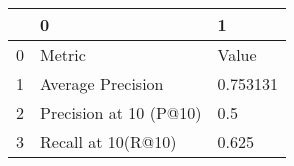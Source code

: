 \begin{tabular}{lll}
\toprule
{} &                       0 &         1 \\
\midrule
0 &                  Metric &     Value \\
1 &       Average Precision &  0.753131 \\
2 &  Precision at 10 (P@10) &       0.5 \\
3 &      Recall at 10(R@10) &     0.625 \\
\bottomrule
\end{tabular}
